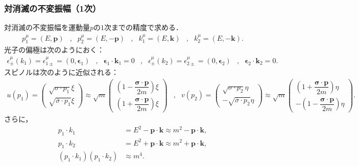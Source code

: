 \subsubsection{対消滅の不変振幅（1次）}
対消滅の不変振幅を運動量$p$の$1$次までの精度で求める．
\begin{align*}
  p_1^\mu  = (E, \boldsymbol{p})
  & , &
  p_2^\mu = (E, -\boldsymbol{p})
  & , &
  k_1^\mu = (E, \boldsymbol{k})
  & , &
  k_2^\mu = (E, -\boldsymbol{k})
  .
\end{align*}
光子の偏極は次のようにおく：
\begin{align*}
  \epsilon_{\pm}^\mu(k_1) = \epsilon_{1\pm}^\mu = (0, \boldsymbol{\epsilon}_1)
  & , &
  \boldsymbol{\epsilon}_1 \cdot \boldsymbol{k}_1 = 0
  & , &
  \epsilon_{\pm}^\mu(k_2) = \epsilon_{2\pm}^\mu = (0, \boldsymbol{\epsilon}_2)
  & , &
  \boldsymbol{\epsilon}_2 \cdot \boldsymbol{k}_2 = 0
  .
\end{align*}
スピノルは次のように近似される：
\begin{align}
  u(p_1) =
  \begin{pmatrix}
    \sqrt{\sigma \cdot p_1} \xi \\
    \sqrt{\overline\sigma \cdot p_1} \xi
  \end{pmatrix}
  \approx \sqrt{m}
  \begin{pmatrix}
    \left( 1 - \dfrac{\boldsymbol\sigma \cdot \boldsymbol{p}}{2m} \right) \xi \\[10pt]
    \left( 1 + \dfrac{\boldsymbol\sigma \cdot \boldsymbol{p}}{2m} \right) \xi
  \end{pmatrix}
  & , &
  v(p_2) =
  \begin{pmatrix}
    \sqrt{\sigma \cdot p_2} \eta \\
    -\sqrt{\overline\sigma \cdot p_2} \eta
  \end{pmatrix}
  \approx \sqrt{m}
  \begin{pmatrix}
    \left( 1 + \dfrac{\boldsymbol\sigma \cdot \boldsymbol{p}}{2m} \right) \eta \\[10pt]
    -\left( 1 - \dfrac{\boldsymbol\sigma \cdot \boldsymbol{p}}{2m} \right) \eta
  \end{pmatrix}
  . \label{prob5_4b_spinor_approx}
\end{align}
さらに，
\begin{align*}
  p_1 \cdot k_1 &= E^2 - \boldsymbol{p} \cdot \boldsymbol{k} \approx m^2 - \boldsymbol{p} \cdot \boldsymbol{k}, \\
  p_1 \cdot k_2 &= E^2 + \boldsymbol{p} \cdot \boldsymbol{k} \approx m^2 + \boldsymbol{p} \cdot \boldsymbol{k}, \\
  (p_1 \cdot k_1)(p_1 \cdot k_2) &\approx m^4 .
\end{align*}

